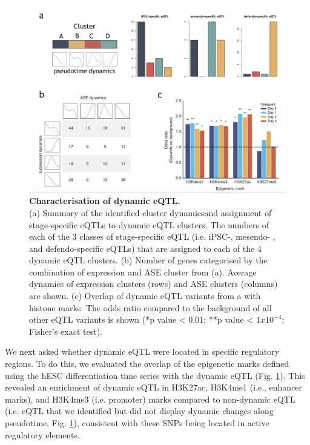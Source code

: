 \begin{figure}[htbp]
\centering
\includegraphics[width=15cm]{Chapter4/Fig/endodiff_dynamic_enrich.png}
\caption[Characterisation of dynamic eQTL]{\textbf{Characterisation of dynamic eQTL.}\\
(a) Summary of the identified cluster dynamics\footnotemark and assignment of stage-specific eQTLs to dynamic eQTL clusters. 
The numbers of each of the 3 classes of stage-specific eQTL (i.e. iPSC-, mesendo- , and defendo-specific eQTLs) that are assigned to each of the 4 dynamic eQTL clusters.
(b) Number of genes categorised by the combination of expression and ASE cluster from (a). 
Average dynamics of expression clusters (rows) and ASE clusters (columns) are shown.
(c) Overlap of dynamic eQTL variants from a with histone marks. The odds ratio compared to the background of all other eQTL variants is shown (*p value < 0.01; **p value < $1x10^{-4}$; Fisher’s exact test).}
\label{fig:endodiff_dynamic_eqtl_enrichment}
\end{figure}



We next asked whether dynamic eQTL were located in specific regulatory regions. 
To do this, we evaluated the overlap of the epigenetic marks defined using the hESC differentiation time series with the dynamic eQTL (Fig. \ref{fig:endodiff_dynamic_eqtl_enrichment}). 
This revealed an enrichment of dynamic eQTL in H3K27ac, H3K4me1 (i.e., enhancer marks), and H3K4me3 (i.e. promoter) marks compared to non-dynamic eQTL (i.e. eQTL that we identified but did not display dynamic changes along pseudotime, Fig. \ref{fig:endodiff_dynamic_eqtl_enrichment}), consistent with these SNPs being located in active regulatory elements.


